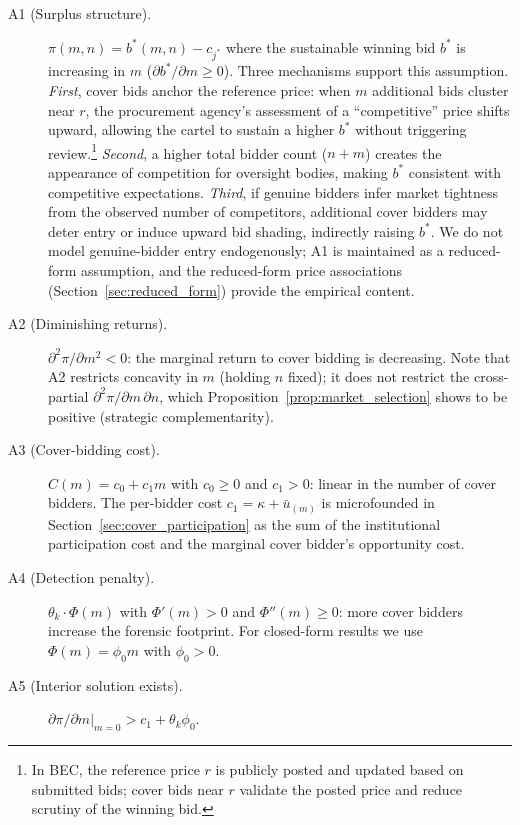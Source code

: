 \begin{description}
  \item[A1 (Surplus structure).] $\pi(m, n) = b^*(m, n) - c_{j^*}$
    where the sustainable winning bid $b^*$ is increasing in $m$
    ($\partial b^* / \partial m \geq 0$). Three mechanisms support this
    assumption. \emph{First}, cover bids anchor the reference price:
    when $m$ additional bids cluster near $r$, the procurement
    agency's assessment of a ``competitive'' price shifts upward,
    allowing the cartel to sustain a higher $b^*$ without triggering
    review.\footnote{In BEC, the reference price $r$ is publicly posted
    and updated based on submitted bids; cover bids near $r$ validate
    the posted price and reduce scrutiny of the winning bid.}
    \emph{Second}, a higher total bidder count ($n + m$) creates the
    appearance of competition for oversight bodies, making $b^*$
    consistent with competitive expectations.
    \emph{Third}, if genuine bidders infer market tightness from the
    observed number of competitors, additional cover bidders may deter
    entry or induce upward bid shading, indirectly raising $b^*$.
    We do not model genuine-bidder entry endogenously; A1 is maintained
    as a reduced-form assumption, and the reduced-form price
    associations (Section~\ref{sec:reduced_form}) provide the empirical
    content.

  \item[A2 (Diminishing returns).] $\partial^2 \pi / \partial m^2 < 0$:
    the marginal return to cover bidding is decreasing. Note that A2
    restricts concavity in $m$ (holding $n$ fixed); it does not
    restrict the cross-partial $\partial^2 \pi / \partial m \, \partial
    n$, which Proposition~\ref{prop:market_selection} shows to be
    positive (strategic complementarity).

  \item[A3 (Cover-bidding cost).] $C(m) = c_0 + c_1 m$ with $c_0 \geq 0$
    and $c_1 > 0$: linear in the number of cover bidders. The
    per-bidder cost $c_1 = \kappa + \bar{u}_{(m)}$ is microfounded
    in Section~\ref{sec:cover_participation} as the sum of the
    institutional participation cost and the marginal cover bidder's
    opportunity cost.

  \item[A4 (Detection penalty).] $\theta_k \cdot \Phi(m)$ with
    $\Phi'(m) > 0$ and $\Phi''(m) \geq 0$: more cover bidders increase
    the forensic footprint. For closed-form results we use
    $\Phi(m) = \phi_0 m$ with $\phi_0 > 0$.

  \item[A5 (Interior solution exists).] $\partial \pi / \partial m
    \big|_{m=0} > c_1 + \theta_k \phi_0$.
\end{description}


